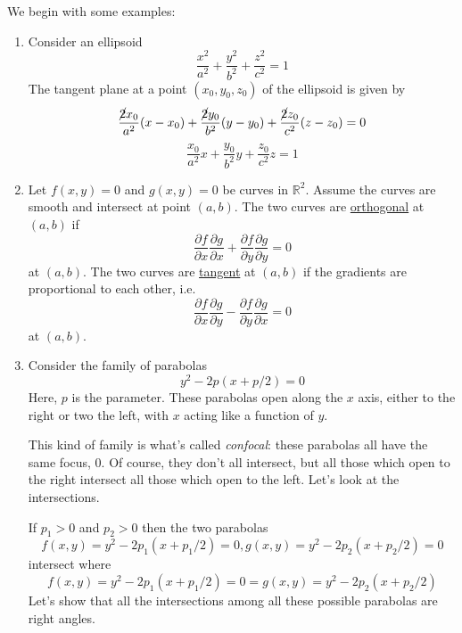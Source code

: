\documentclass{article}
\newcommand{\reals}[0]{\mathbb{R}}
\newcommand{\prt}[2]{\frac{\partial #1}{\partial #2}}
\begin{document}
We begin with some examples:
\begin{enumerate}

  \item Consider an ellipsoid
  \begin{equation}\frac{x^2}{a^2} + \frac{y^2}{b^2} + \frac{z^2}{c^2} = 1\end{equation}
  The tangent plane at a point \((x_0, y_0, z_0)\) of the ellipsoid is given by
  \begin{equation}\frac{\cancel{2}x_0}{a^2}(x - x_0) + \frac{\cancel{2}y_0}{b^2}(y - y_0) + \frac{\cancel{2}z_0}{c^2}(z - z_0) = 0\end{equation}
  \begin{equation}\frac{x_0}{a^2}x + \frac{y_0}{b^2}y + \frac{z_0}{c^2}z = 1\end{equation}

  \item Let \(f(x, y) = 0\) and \(g(x, y) = 0\) be curves in \(\reals^2\). Assume the curves are smooth and intersect at point \((a, b)\). The two curves are \underline{orthogonal} at \((a, b)\) if
  \begin{equation}\prt{f}{x}\prt{g}{x} + \prt{f}{y}\prt{g}{y} = 0\end{equation}
  at \((a, b)\). The two curves are \underline{tangent} at \((a, b)\) if the gradients are proportional to each other, i.e.
  \begin{equation}\prt{f}{x}\prt{g}{y} - \prt{f}{y}\prt{g}{x} = 0\end{equation}
  at \((a, b)\).

  \item Consider the family of parabolas
  \begin{equation}y^2 - 2p(x + p/2) = 0\end{equation}
  Here, \(p\) is the parameter. These parabolas open along the \(x\) axis, either to the right or two the left, with \(x\) acting like a function of \(y\).

  This kind of family is what's called \textit{confocal}: these parabolas all have the same focus, 0. Of course, they don't all intersect, but all those which open to the right intersect all those which open to the left. Let's look at the intersections.

  If \(p_1 > 0\) and \(p_2 > 0\) then the two parabolas
  \begin{equation}f(x, y) = y^2 - 2p_1(x + p_1/2) = 0, g(x, y) = y^2 - 2p_2(x + p_2/2) = 0\end{equation}
  intersect where
  \begin{equation}f(x, y) = y^2 - 2p_1(x + p_1/2) = 0 = g(x, y) = y^2 - 2p_2(x + p_2/2)\end{equation}
  Let's show that all the intersections among all these possible parabolas are right angles.


\end{enumerate}
\end{document}
